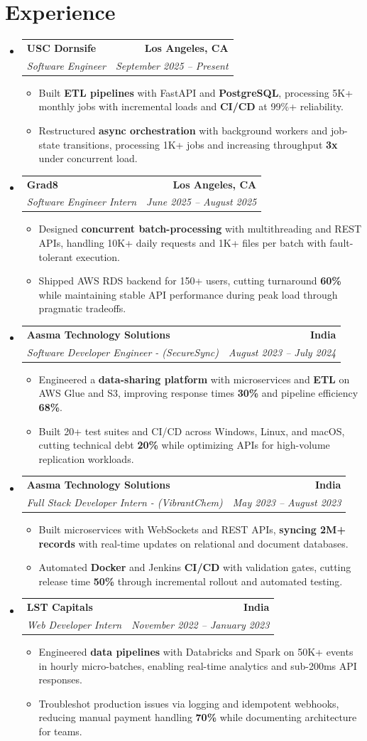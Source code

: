 \documentclass[letterpaper,10pt]{article}
\makeatletter
\newcommand{\resumeItem}[1]{\item\small{{#1 \vspace{-2pt}}}}
\newcommand{\resumeSubheading}[4]{\vspace{-1pt}\item\begin{tabular*}{1.0\textwidth}[t]{l@{\extracolsep{\fill}}r}\textbf{#1} & \textbf{\small #2} \\\textit{\small#3} & \textit{\small #4} \\\end{tabular*}\vspace{-2pt}}
\newcommand{\resumeSubHeadingListStart}{\begin{itemize}[leftmargin=0.0in, label={}]}
\newcommand{\resumeSubHeadingListEnd}{\end{itemize}}
\newcommand{\resumeItemListStart}{\begin{itemize}[leftmargin=0.15in,label=\textbullet,itemsep=2pt,topsep=0pt,parsep=0pt,partopsep=0pt]}
\newcommand{\resumeItemListEnd}{\end{itemize}\vspace{-4pt}}
\makeatother
\begin{document}
\section{Experience}
\resumeSubHeadingListStart
\resumeSubheading{USC Dornsife}{Los Angeles, CA}{Software Engineer}{September 2025 -- Present}
\resumeItemListStart
\resumeItem{Built \textbf{ETL pipelines} with FastAPI and \textbf{PostgreSQL}, processing 5K+ monthly jobs with incremental loads and \textbf{CI/CD} at 99\%+ reliability.}
\resumeItem{Restructured \textbf{async orchestration} with background workers and job-state transitions, processing 1K+ jobs and increasing throughput \textbf{3x} under concurrent load.}
\resumeItemListEnd
\resumeSubheading{Grad8}{Los Angeles, CA}{Software Engineer Intern}{June 2025 -- August 2025}
\resumeItemListStart
\resumeItem{Designed \textbf{concurrent batch-processing} with multithreading and REST APIs, handling 10K+ daily requests and 1K+ files per batch with fault-tolerant execution.}
\resumeItem{Shipped AWS RDS backend for 150+ users, cutting turnaround \textbf{60\%} while maintaining stable API performance during peak load through pragmatic tradeoffs.}
\resumeItemListEnd
\resumeSubheading{Aasma Technology Solutions}{India}{Software Developer Engineer - (SecureSync)}{August 2023 -- July 2024}
\resumeItemListStart
\resumeItem{Engineered a \textbf{data-sharing platform} with microservices and \textbf{ETL} on AWS Glue and S3, improving response times \textbf{30\%} and pipeline efficiency \textbf{68\%}.}
\resumeItem{Built 20+ test suites and CI/CD across Windows, Linux, and macOS, cutting technical debt \textbf{20\%} while optimizing APIs for high-volume replication workloads.}
\resumeItemListEnd
\resumeSubheading{Aasma Technology Solutions}{India}{Full Stack Developer Intern - (VibrantChem)}{May 2023 -- August 2023}
\resumeItemListStart
\resumeItem{Built microservices with WebSockets and REST APIs, \textbf{syncing 2M+ records} with real-time updates on relational and document databases.}
\resumeItem{Automated \textbf{Docker} and Jenkins \textbf{CI/CD} with validation gates, cutting release time \textbf{50\%} through incremental rollout and automated testing.}
\resumeItemListEnd
\resumeSubheading{LST Capitals}{India}{Web Developer Intern}{November 2022 -- January 2023}
\resumeItemListStart
\resumeItem{Engineered \textbf{data pipelines} with Databricks and Spark on 50K+ events in hourly micro-batches, enabling real-time analytics and sub-200ms API responses.}
\resumeItem{Troubleshot production issues via logging and idempotent webhooks, reducing manual payment handling \textbf{70\%} while documenting architecture for teams.}
\resumeItemListEnd
\resumeSubHeadingListEnd
\vspace{-6pt}
\end{document}
